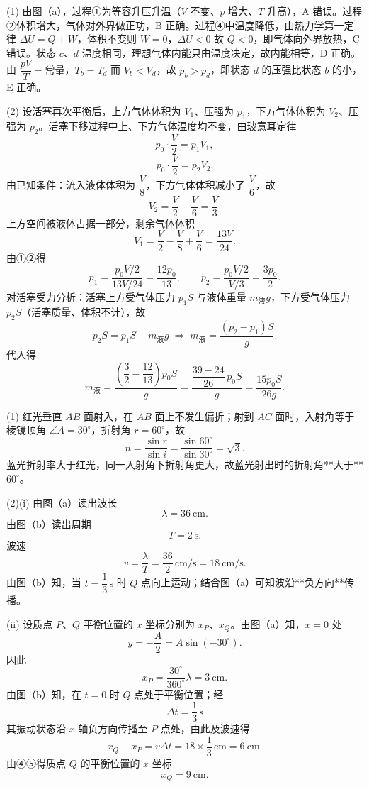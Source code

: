 \begin{answer}
(1) 由图（a），过程①为等容升压升温（$V$ 不变、$p$ 增大、$T$ 升高），A 错误。过程②体积增大，气体对外界做正功，B 正确。过程④中温度降低，由热力学第一定律 $\Delta U=Q+W$，体积不变则 $W=0$，$\Delta U<0$ 故 $Q<0$，即气体向外界放热，C 错误。状态 $c$、$d$ 温度相同，理想气体内能只由温度决定，故内能相等，D 正确。由 $\dfrac{pV}{T}=\text{常量}$，$T_{b}=T_{d}$ 而 $V_{b}<V_{d}$，故 $p_{b}>p_{d}$，即状态 $d$ 的压强比状态 $b$ 的小，E 正确。

(2) 设活塞再次平衡后，上方气体体积为 $V_{1}$、压强为 $p_{1}$，下方气体体积为 $V_{2}$、压强为 $p_{2}$。活塞下移过程中上、下方气体温度均不变，由玻意耳定律
\[
  p_{0}\cdot\frac{V}{2}=p_{1}V_{1}, \tag{①}
\]
\[
  p_{0}\cdot\frac{V}{2}=p_{2}V_{2}. \tag{②}
\]
由已知条件：流入液体体积为 $\dfrac{V}{8}$，下方气体体积减小了 $\dfrac{V}{6}$，故
\[
  V_{2}=\frac{V}{2}-\frac{V}{6}=\frac{V}{3}.
\]
上方空间被液体占据一部分，剩余气体体积
\[
  V_{1}=\frac{V}{2}-\frac{V}{8}+\frac{V}{6}=\frac{13V}{24}.
\]
由①②得
\[
  p_{1}=\frac{p_{0}V/2}{13V/24}=\frac{12p_{0}}{13},\qquad
  p_{2}=\frac{p_{0}V/2}{V/3}=\frac{3p_{0}}{2}.
\]
对活塞受力分析：活塞上方受气体压力 $p_{1}S$ 与液体重量 $m_{\text{液}}g$，下方受气体压力 $p_{2}S$（活塞质量、体积不计），故
\[
  p_{2}S=p_{1}S+m_{\text{液}}g
  \;\Longrightarrow\;
  m_{\text{液}}=\frac{(p_{2}-p_{1})S}{g}.
\]
代入得
\[
  m_{\text{液}}=\frac{\left(\dfrac{3}{2}-\dfrac{12}{13}\right)p_{0}S}{g}
  =\frac{\dfrac{39-24}{26}\,p_{0}S}{g}
  =\frac{15p_{0}S}{26g}.
\]
\end{answer}

\begin{answer}
(1) 红光垂直 $AB$ 面射入，在 $AB$ 面上不发生偏折；射到 $AC$ 面时，入射角等于棱镜顶角 $\angle A=30^{\circ}$，折射角 $r=60^{\circ}$，故
\[
  n=\frac{\sin r}{\sin i}=\frac{\sin60^{\circ}}{\sin30^{\circ}}=\sqrt{3}.
\]
蓝光折射率大于红光，同一入射角下折射角更大，故蓝光射出时的折射角**大于** $60^{\circ}$。

(2)(i) 由图（a）读出波长
\[
  \lambda=\SI{36}{\centi\metre}.
\]
由图（b）读出周期
\[
  T=\SI{2}{\second}.
\]
波速
\[
  v=\frac{\lambda}{T}=\frac{36}{2}\,\si{\centi\metre\per\second}=\SI{18}{\centi\metre\per\second}.
\]
由图（b）知，当 $t=\dfrac{1}{3}\,\si{\second}$ 时 $Q$ 点向上运动；结合图（a）可知波沿**负方向**传播。

(ii) 设质点 $P$、$Q$ 平衡位置的 $x$ 坐标分别为 $x_{P}$、$x_{Q}$。由图（a）知，$x=0$ 处
\[
  y=-\frac{A}{2}=A\sin(-30^{\circ}). \tag{④}
\]
因此
\[
  x_{P}=\frac{30^{\circ}}{360^{\circ}}\lambda=\SI{3}{\centi\metre}.
\]
由图（b）知，在 $t=0$ 时 $Q$ 点处于平衡位置；经
\[
  \Delta t=\frac{1}{3}\,\si{\second}
\]
其振动状态沿 $x$ 轴负方向传播至 $P$ 点处，由此及波速得
\[
  x_{Q}-x_{P}=v\Delta t=18\times\frac{1}{3}\,\si{\centi\metre}=\SI{6}{\centi\metre}. \tag{⑤}
\]
由④⑤得质点 $Q$ 的平衡位置的 $x$ 坐标
\[
  x_{Q}=\SI{9}{\centi\metre}.
\]
\end{answer}
